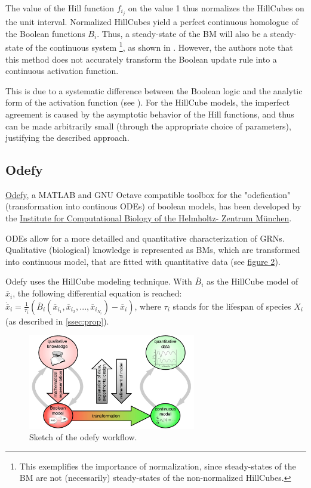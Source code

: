 \documentclass[11pt]{article}
\begin{document}
The value of the Hill function $f_{i_{j}}$ on the value 1 thus normalizes the HillCubes on the unit interval. Normalized HillCubes yield a perfect continuous homologue of the Boolean functions $B_{i}$. Thus, a steady-state of the BM will
also be a steady-state of the continuous system \footnote{This exemplifies the importance of normalization, since steady-states of the BM are not (necessarily) steady-states of the non-normalized HillCubes.}, as shown in \cite{Wittmann}. However, the authors note that this method does not accurately transform the Boolean update rule into a continuous activation function. 

This is due to a systematic difference between the Boolean logic and the analytic form of the activation function (see \cite{Wittmann}). For the HillCube models, the imperfect agreement is caused by the asymptotic behavior of the Hill
functions, and thus can be made arbitrarily small (through the appropriate choice of parameters), justifying the described approach.

\subsection{Odefy}
\href{http://www.helmholtz-muenchen.de/icb/software/odefy/index.html}{Odefy}, a MATLAB and GNU Octave compatible toolbox for the "odefication" (transformation into continous ODEs) of boolean models, has been developed by the \href{http://www.helmholtz-muenchen.de/icb/index.html}{Institute for Computational Biology of the Helmholtz-
Zentrum M{\"u}nchen}.

ODEs allow for a more detailled and quantitative characterization of GRNs. Qualitative (biological) knowledge is represented as BMs, which are transformed into continuous model, that are fitted with quantitative data (see \hyperref[odefy_workflow]{figure 2}).

Odefy uses the HillCube modeling technique. With $\overline{B}_{i}$ as the HillCube model of $\overline{x}_{i}$, the following differential equation is reached: $\dot{\overline{x}}_{i} = \frac{1}{\tau_{i}} (\overline{B}_{i} (\overline{x}_{i_{1}}, \overline{x}_{i_{2}},..., \overline{x}_{i_{N_{i}}} ) - \overline{x}_{i} )$, where $\tau_{i}$ stands for the lifespan of species $X_{i}$ (as described in \ref{ssec:prop}).

\begin{figure}[hb]
  \centering
  \includegraphics[width=0.65\textwidth]{odefy.jpg}
  \caption{\label{odefy_workflow} Sketch of the odefy workflow.}
\end{figure}
\end{document}
